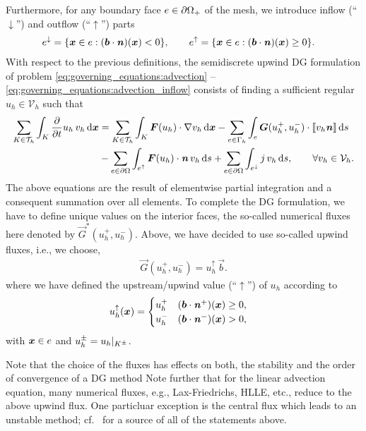 \documentclass{scrreprt}
\begin{document}
Furthermore, for any boundary face $e\in{{\partial\Omega}_{+}}$
of the mesh, we introduce inflow (``$\downarrow$'') and outflow
(``$\uparrow$'') parts
\begin{align}
e^{\downarrow} &= \{ {\boldsymbol x} \in e :({\boldsymbol b} \cdot
{\boldsymbol {\mathit{n}}})({\boldsymbol x}) < 0\},\qquad
e^{\uparrow} = \{ {\boldsymbol x} \in e : ({\boldsymbol b} \cdot{\boldsymbol {\mathit{n}}})({\boldsymbol x})
\geq 0\}.
\end{align}
With respect to the previous definitions, the semidiscrete upwind DG
formulation of problem \eqref{eq:governing_equations:advection} -- \eqref{eq:governing_equations:advection_inflow}
consists of
finding a sufficient regular $u_h\in\mathcal{V}_h$ such that
\begin{align}
\sum_{K \in \mathcal{T}_h} \int_K \frac{\partial}{\partial t}u_h\,v_h\,\text{d}{\boldsymbol x}
&=
\sum_{K \in \mathcal{T}_h} \int_K {\boldsymbol F}(u_h) \cdot \nabla v_h\,\text{d}{\boldsymbol x}
- \sum_{e \in \Gamma_h} \int_e
{\boldsymbol G}(u_h^{+},u_h^{-})\cdot\llbracket{v_h {\boldsymbol {\mathit{n}}}}\rrbracket\,\text{d}s
\\
&- \sum_{e \in {\partial\Omega}} \int_{e^{\uparrow}}
{\boldsymbol F}(u_h) \cdot {\boldsymbol {\mathit{n}}} \,v_h\,\text{d}s
+ \sum_{e \in {\partial\Omega}} \int_{e^{\downarrow}}
j\,v_h\,\text{d}s,
\qquad\forall v_h \in\mathcal{V}_h.
\notag
\end{align}
The above equations are the result of elementwise partial integration
and a consequent summation over all elements.
To complete the DG formulation, we have to define unique values
on the interior faces, the so-called numerical fluxes here denoted by
$\vec{G}^{*}(u_h^{+},u_h^{-})$.
Above, we have decided to use so-called upwind fluxes, i.e.,
we choose,
\begin{align}
\vec{G}(u_h^{+},u_h^{-}) = u_h^{\uparrow}\,\vec{b}.
\end{align}
where we have defined the upstream/upwind value (``$\uparrow$'')
of $u_h$ according to
\begin{align}
u_h^{\uparrow}({\boldsymbol x}) &=
\begin{cases}
u_h^{+}&({\boldsymbol b} \cdot {\boldsymbol {\mathit{n}}}^{+})({\boldsymbol x}) \geq 0,
\\
u_h^{-}&({\boldsymbol b} \cdot {\boldsymbol {\mathit{n}}}^{-})({\boldsymbol x}) > 0,
\end{cases}
\end{align}
with ${\boldsymbol x} \in e$ and $u_h^{\pm}=u_h|_{K^{\pm}}$.

Note that the choice of the fluxes has effects on both,
the stability and the order of convergence of a DG method
Note further that for the linear advection equation,
many numerical fluxes, e.g., Lax-Friedrichs, HLLE, etc., reduce to the above
upwind flux. One particluar exception is the central flux which leads to an
unstable method; cf.~\cite{hartmann_2008} for a source of all of the statements
above.
\end{document}
